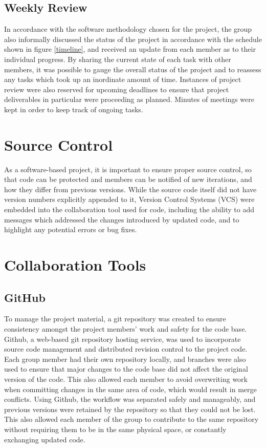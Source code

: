 \subsection{Weekly Review}
In accordance with the software methodology chosen for the project, the group also informally discussed the status of the project in accordance with the schedule shown in figure \ref{timeline}, and received an update from each member as to their individual progress. By sharing the current state of each task with other members, it was possible to gauge the overall status of the project and to reassess any tasks which took up an inordinate amount of time. Instances of project review were also reserved for upcoming deadlines to ensure that project deliverables in particular were proceeding as planned. Minutes of meetings were kept in order to keep track of ongoing tasks.

\section{Source Control}
As a software-based project, it is important to ensure proper source control, so that code can be protected and members can be notified of new iterations, and how they differ from previous versions. While the source code itself did not have version numbers explicitly appended to it, Version Control Systems (VCS) were embedded into the collaboration tool used for code, including the ability to add messages which addressed the changes introduced by updated code, and to highlight any potential errors or bug fixes.

\section{Collaboration Tools}
\label{colab}

\subsection{GitHub}
To manage the project material, a git repository was created to ensure consistency amongst the project members' work and safety for the code base. Github, a web-based git repository hosting service, was used to incorporate source code management and distributed revision control to the project code. Each group member had their own repository locally, and branches were also used to ensure that major changes to the code base did not affect the original version of the code. This also allowed each member to avoid overwriting work when committing changes in the same area of code, which would result in merge conflicts. Using Github, the workflow was separated safely and manageably, and previous versions were retained by the repository so that they could not be lost. This also allowed each member of the group to contribute to the same repository without requiring them to be in the same physical space, or constantly exchanging updated code.

